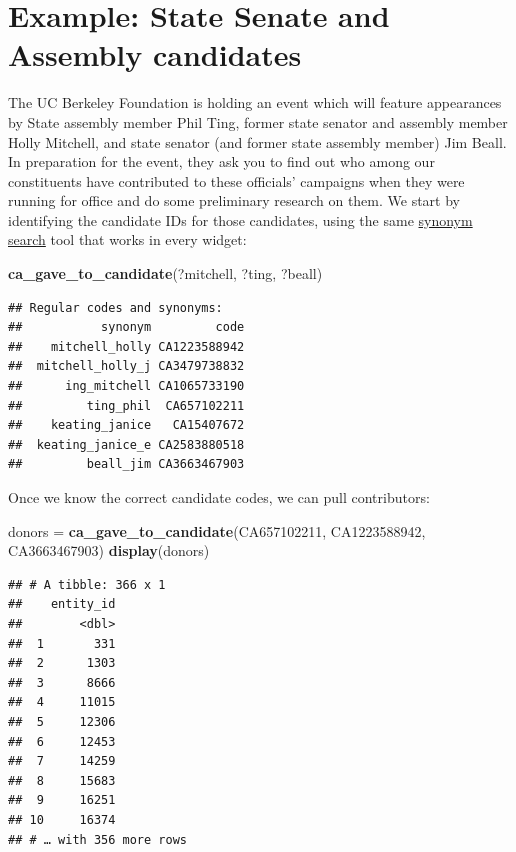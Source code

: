 \documentclass[]{book}
\newenvironment{Shaded}{\begin{snugshade}}{\end{snugshade}}
\newcommand{\KeywordTok}[1]{\textcolor[rgb]{0.13,0.29,0.53}{\textbf{#1}}}
\newcommand{\NormalTok}[1]{#1}
\newcommand{\StringTok}[1]{\textcolor[rgb]{0.31,0.60,0.02}{#1}}
\begin{document}
\hypertarget{example-state-senate-and-assembly-candidates}{%
\section{Example: State Senate and Assembly candidates}\label{example-state-senate-and-assembly-candidates}}

The UC Berkeley Foundation is holding an event which will feature appearances by State assembly member Phil Ting, former state senator and assembly member Holly Mitchell, and state senator (and former state assembly member) Jim Beall. In preparation for the event, they ask you to find out who among our constituents have contributed to these officials' campaigns when they were running for office and do some preliminary research on them. We start by identifying the candidate IDs for those candidates, using the same \protect\hyperlink{synonym-search}{synonym search} tool that works in every widget:

\begin{Shaded}
\begin{Highlighting}[]
\KeywordTok{ca_gave_to_candidate}\NormalTok{(?mitchell, ?ting, ?beall)}
\end{Highlighting}
\end{Shaded}

\begin{verbatim}
## Regular codes and synonyms:
##           synonym         code
##    mitchell_holly CA1223588942
##  mitchell_holly_j CA3479738832
##      ing_mitchell CA1065733190
##         ting_phil  CA657102211
##    keating_janice   CA15407672
##  keating_janice_e CA2583880518
##         beall_jim CA3663467903
\end{verbatim}

Once we know the correct candidate codes, we can pull contributors:

\begin{Shaded}
\begin{Highlighting}[]
\NormalTok{donors =}\StringTok{ }\KeywordTok{ca_gave_to_candidate}\NormalTok{(CA657102211, CA1223588942, CA3663467903)}
\KeywordTok{display}\NormalTok{(donors)}
\end{Highlighting}
\end{Shaded}

\begin{verbatim}
## # A tibble: 366 x 1
##    entity_id
##        <dbl>
##  1       331
##  2      1303
##  3      8666
##  4     11015
##  5     12306
##  6     12453
##  7     14259
##  8     15683
##  9     16251
## 10     16374
## # … with 356 more rows
\end{verbatim}
\end{document}
